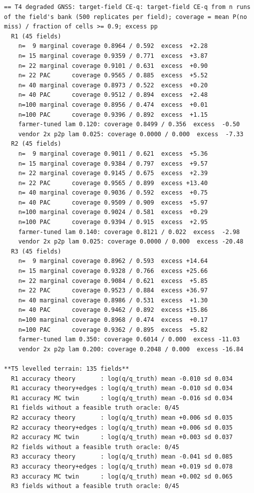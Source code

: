 \documentclass[preprint,12pt,authoryear]{elsarticle}
\begin{document}
\begin{Verbatim}[fontsize=\tiny,breaklines]
== T4 degraded GNSS: target-field CE-q: target-field CE-q from n runs of the field's bank (500 replicates per field); coverage = mean P(no miss) / fraction of cells >= 0.9; excess pp
  R1 (45 fields)
    n=  9 marginal coverage 0.8964 / 0.592  excess  +2.28
    n= 15 marginal coverage 0.9359 / 0.771  excess  +3.87
    n= 22 marginal coverage 0.9101 / 0.631  excess  +0.90
    n= 22 PAC      coverage 0.9565 / 0.885  excess  +5.52
    n= 40 marginal coverage 0.8973 / 0.522  excess  +0.20
    n= 40 PAC      coverage 0.9512 / 0.894  excess  +2.48
    n=100 marginal coverage 0.8956 / 0.474  excess  +0.01
    n=100 PAC      coverage 0.9396 / 0.892  excess  +1.15
    farmer-tuned lam 0.120: coverage 0.8499 / 0.356  excess  -0.50
    vendor 2x p2p lam 0.025: coverage 0.0000 / 0.000  excess  -7.33
  R2 (45 fields)
    n=  9 marginal coverage 0.9011 / 0.621  excess  +5.36
    n= 15 marginal coverage 0.9384 / 0.797  excess  +9.57
    n= 22 marginal coverage 0.9145 / 0.675  excess  +2.39
    n= 22 PAC      coverage 0.9565 / 0.899  excess +13.40
    n= 40 marginal coverage 0.9036 / 0.592  excess  +0.75
    n= 40 PAC      coverage 0.9509 / 0.909  excess  +5.97
    n=100 marginal coverage 0.9024 / 0.581  excess  +0.29
    n=100 PAC      coverage 0.9394 / 0.915  excess  +2.95
    farmer-tuned lam 0.140: coverage 0.8121 / 0.022  excess  -2.98
    vendor 2x p2p lam 0.025: coverage 0.0000 / 0.000  excess -20.48
  R3 (45 fields)
    n=  9 marginal coverage 0.8962 / 0.593  excess +14.64
    n= 15 marginal coverage 0.9328 / 0.766  excess +25.66
    n= 22 marginal coverage 0.9084 / 0.621  excess  +5.85
    n= 22 PAC      coverage 0.9523 / 0.884  excess +36.97
    n= 40 marginal coverage 0.8986 / 0.531  excess  +1.30
    n= 40 PAC      coverage 0.9462 / 0.892  excess +15.86
    n=100 marginal coverage 0.8968 / 0.474  excess  +0.17
    n=100 PAC      coverage 0.9362 / 0.895  excess  +5.82
    farmer-tuned lam 0.350: coverage 0.6014 / 0.000  excess -11.03
    vendor 2x p2p lam 0.200: coverage 0.2048 / 0.000  excess -16.84

**T5 levelled terrain: 135 fields**
  R1 accuracy theory       : log(q/q_truth) mean -0.010 sd 0.034
  R1 accuracy theory+edges : log(q/q_truth) mean -0.010 sd 0.034
  R1 accuracy MC twin      : log(q/q_truth) mean -0.016 sd 0.034
  R1 fields without a feasible truth oracle: 0/45
  R2 accuracy theory       : log(q/q_truth) mean +0.006 sd 0.035
  R2 accuracy theory+edges : log(q/q_truth) mean +0.006 sd 0.035
  R2 accuracy MC twin      : log(q/q_truth) mean +0.003 sd 0.037
  R2 fields without a feasible truth oracle: 0/45
  R3 accuracy theory       : log(q/q_truth) mean -0.041 sd 0.085
  R3 accuracy theory+edges : log(q/q_truth) mean +0.019 sd 0.078
  R3 accuracy MC twin      : log(q/q_truth) mean +0.002 sd 0.065
  R3 fields without a feasible truth oracle: 0/45


\end{Verbatim}
\end{document}
